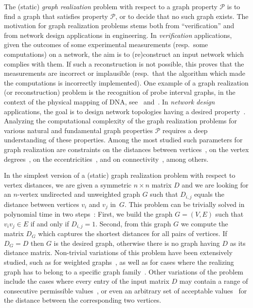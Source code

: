 \documentclass[a4paper,UKenglish,cleveref, autoref, thm-restate]{lipics-v2021}
\begin{document}
The (static) \emph{graph realization} problem with respect to a graph property $\mathcal{P}$ is to find a graph that satisfies property $\mathcal{P}$, or to decide that no such graph exists. 
The motivation for graph realization problems stems both from ``verification'' and from network design applications in engineering. 
In \emph{verification} applications, given the outcomes of some experimental measurements (resp.~some computations) on a network, 
the aim is to (re)construct an input network which complies with them. 
If such a reconstruction is not possible, this proves that the measurements are incorrect or implausible (resp.~that the algorithm which made the computations is incorrectly implemented). 
One example of a graph realization (or reconstruction) problem is the recognition of probe interval graphs, in the context of the physical mapping of DNA, see~\cite{McMorris98,McConnellS02} and~\cite[Chapter 4]{GolumbicTrenk04}.
In \emph{network design} applications, the goal is to design network topologies having a desired property~\cite{augustine2022distributed,grotschel1995design}.
Analyzing the computational complexity of the graph realization problems for various natural and fundamental graph properties $\mathcal{P}$ requires a deep understanding of these properties.
Among the most studied such parameters for graph realization 
are constraints on the distances between vertices~\cite{barNoy2022GraphRealization,barNoy2021composed,hakimi1965distance,chung2001distance,bixby1988almost,culberson1989fast}, 
on the vertex degrees~\cite{GolovachM17,gomory1961multi,hakimi1962realizability,Bar-NoyCPR20,erdos1960graphs}, 
on the eccentricities~\cite{barNoy2020efficiently,hell2009linear,behzad1976eccentric,lesniak1975eccentric}, and on connectivity~\cite{fulkerson1960zero,frank1992augmenting,chen1966realization,frank1994connectivity,frank1970connectivity,gomory1961multi}, among others. 


In the simplest version of a (static) graph realization problem with respect to vertex distances, 
we are given a symmetric $n \times n$ matrix $D$ and we are looking for an $n$-vertex undirected and unweighted graph $G$ such that $D_{i,j}$ equals the distance between vertices $v_i$ and $v_j$ in~$G$. This problem can be trivially solved in polynomial time in two steps~\cite{hakimi1965distance}: First, we build the graph $G=(V,E)$ such that $v_i v_j \in E$ if and only if $D_{i,j}=1$. Second, from this graph $G$ we compute the matrix $D_G$ which captures the shortest distances for all pairs of vertices. If $D_G = D$ then $G$ is the desired graph, otherwise there is no graph having $D$ as its distance matrix. 
Non-trivial variations of this problem have been extensively studied, such as for weighted graphs~\cite{hakimi1965distance,Patrinos-Hakimi-72}, as well as for cases where the realizing graph has to belong to a specific graph family~\cite{hakimi1965distance, barNoy2021composed}. Other variations of the problem include the cases where every entry of the input matrix $D$ may contain a range of consecutive permissible values~\cite{barNoy2021composed,Rubei16,Tamura93}, or even an arbitrary set of acceptable values~\cite{barNoy2022GraphRealization} for the distance between the corresponding two vertices. 
\end{document}

